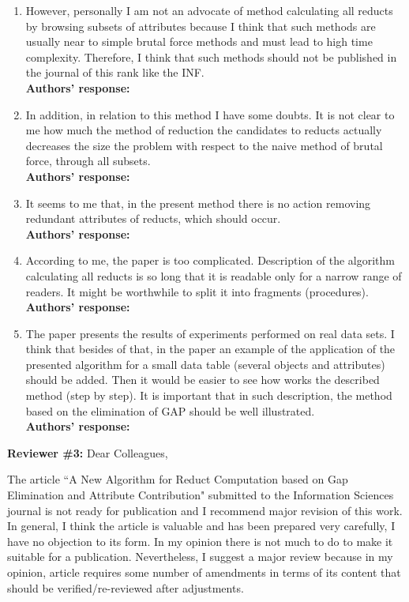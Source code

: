 \documentclass{letter}
\begin{document}
\begin{letter}{}
  \begin{enumerate}
    \item However, personally I am not  an advocate of method calculating all reducts by browsing subsets of attributes because I think that such methods are usually near to simple brutal force methods and must lead to high time complexity. Therefore, I think that such methods should not be published in the journal of this rank like the INF.\\
    \textbf{Authors’ response:} 
    
    \item In addition, in relation to this method I have some doubts. It is not clear to me how much the method of reduction the candidates to reducts actually decreases the size the problem with respect to the naive method of brutal force, through all subsets.\\
    \textbf{Authors’ response:} 

    \item It seems to me that, in the present method there is no action removing redundant attributes of reducts, which should occur.\\
    \textbf{Authors’ response:} 

	\item According to me, the paper is too complicated. Description of the algorithm calculating all reducts is so long that it is readable only for a narrow range of readers. It might be worthwhile to split it into fragments (procedures).\\
	\textbf{Authors’ response:} 

	\item The paper presents the results of experiments performed on real data sets. I think that besides of that, in the paper an example of the application of the presented algorithm for a small data table (several objects and attributes) should be added. Then it would be easier to see how works the described method (step by step). It is important that in such description, the method based on the elimination of GAP should be well illustrated.\\
	\textbf{Authors’ response:} 
  \end{enumerate}    
  
  
  \textbf{Reviewer \#3:} Dear Colleagues,
  
  The article ``A New Algorithm for Reduct Computation based on Gap Elimination and Attribute Contribution" submitted to the Information Sciences journal is not ready for publication and I recommend major revision of this work. In general, I think the article is valuable and has been prepared very carefully, I have no objection to its form. In my opinion there is not much to do to make it suitable for a publication. Nevertheless, I suggest a major review because in my opinion, article requires some number of amendments in terms of its content that should be verified/re-reviewed after adjustments.  
  

\end{letter}
\end{document}

